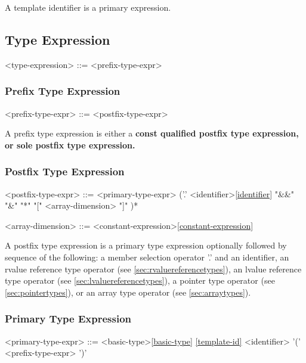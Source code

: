 \documentclass[a4paper,oneside,11pt]{article}
\begin{document}
A template identifier is a primary expression.

\subsection{Type Expression}\label{sec:typeexpr}

\begin{grammar}
\label{type-expression}<type-expression> ::= <prefix-type-expr>
\end{grammar}

\subsubsection{Prefix Type Expression}

\begin{grammar}
<prefix-type-expr> ::=  <postfix-type-expr>
\end{grammar}

A prefix type expression is either a \bf{const} qualified postfix type expression,
or sole postfix type expression.

\subsubsection{Postfix Type Expression}\label{sec:postfixtypeexpr}

\begin{grammar}
<postfix-type-expr> ::= <primary-type-expr> ('.' <identifier>\ref{identifier}
\alt "&&"
\alt "&"
\alt "*"
\alt "[" <array-dimension> "]"
)*

<array-dimension> ::= <constant-expression>\ref{constant-expression}
\end{grammar}

A postfix type expression is a primary type expression optionally followed by sequence of the
following:
a member selection operator '.' and an identifier, an rvalue reference type operator (see \ref{sec:rvaluereferencetypes}),
an lvalue reference type operator (see \ref{sec:lvaluereferencetypes}), a pointer type operator (see \ref{sec:pointertypes}),
or an array type operator (see \ref{sec:arraytypes}).

\subsubsection{Primary Type Expression}

\begin{grammar}
<primary-type-expr> ::= <basic-type>\ref{basic-type}
\ref{template-id}
\alt <identifier>
\alt '(' <prefix-type-expr> ')'
\end{grammar}
\end{document}
